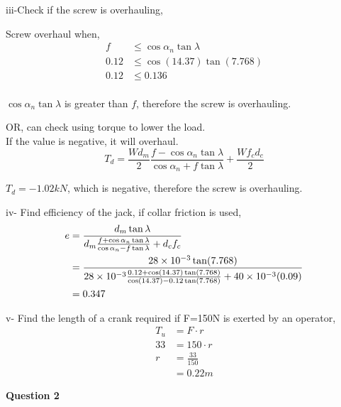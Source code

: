 \documentclass[a4paper, fleqn]{article}
\providecommand{\sci}[1]{\protect\ensuremath{\times 10^{\StrSubstitute[0]{#1}{e}{}}}}
\begin{document}
iii-Check if the screw is overhauling,

Screw overhaul when,
\begin{equation*}
    \begin{aligned}
    f &\le \cos \alpha_n \tan \lambda \\
    0.12 &\le \cos(14.37) \tan(7.768)\\
    0.12 &\le 0.136\\
    \end{aligned}
\end{equation*}

$\cos \alpha_n \tan \lambda$ is greater than $f$, therefore the screw is overhauling.
\vspace{10pt}

OR, can check using torque to lower the load. \\
If the value is negative, it will overhaul.
$$T_d = \frac{Wd_m}{2} \frac{f-\cos\alpha_n \tan\lambda}{\cos\alpha_n + f\tan\lambda} + \frac{Wf_c d_c}{2}$$

$T_d=-1.02kN$, which is negative, therefore the screw is overhauling.
\vspace{10pt}

iv- Find efficiency of the jack, if collar friction is used,
\begin{equation*}
    \begin{aligned}
    e &=\frac{d_m \tan \lambda}{d_m \frac{f+\cos\alpha_n \tan\lambda}{\cos\alpha_n - f\tan\lambda}+d_c f_c} \\
    &=\frac{28\sci{e-3} \tan(7.768)}{28\sci{e-3} \frac{0.12+\cos(14.37) \tan(7.768)}{\cos(14.37) - 0.12\tan(7.768)}+40\sci{e-3} (0.09)} \\
    &=0.347
    \end{aligned}
\end{equation*}

v- Find the length of a crank required if F=150N is exerted by an operator,
\begin{equation*}
    \begin{aligned}
    T_u &= F \cdot r\\
    33 &= 150 \cdot r\\
    r &= \frac{33}{150}\\
    &= 0.22 m
    \end{aligned}
\end{equation*}

\newpage
\textbf{Question 2}
\end{document}
